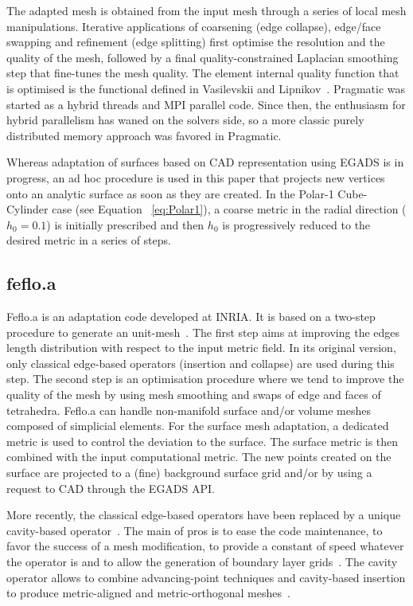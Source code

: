 \documentclass[3p,times,procedia,number]{elsarticle}
\begin{document}
The adapted mesh is obtained from the input mesh through a series of
local mesh manipulations. Iterative applications of coarsening (edge collapse),
edge/face swapping and refinement (edge splitting) first optimise the
resolution and the quality of the mesh, followed by a final
quality-constrained Laplacian smoothing step that fine-tunes the mesh
quality. The element internal quality function that is optimised is
the functional defined in Vasilevskii and Lipnikov~\cite{Vasilevskii-1999}.
Pragmatic was started as a hybrid threads and MPI parallel code. Since
then, the enthusiasm for hybrid parallelism has waned on the solvers side,
so a more classic purely distributed memory approach was favored in 
Pragmatic.

Whereas adaptation of surfaces based on CAD representation using EGADS
is in progress, an ad hoc procedure is used in this paper that projects 
new vertices onto an analytic surface as soon as they are created.
In the Polar-1 Cube-Cylinder case (see Equation ~\ref{eq:Polar1}),
a coarse metric in the radial direction
($h_0 = 0.1$) is initially prescribed and then
$h_0$ is progressively reduced to the desired metric in a series of steps.

\subsection{feflo.a}

Feflo.a is an adaptation code developed at INRIA.
It is based on a two-step procedure to generate an unit-mesh~\cite{loseille-lohner-adapt-boom,loseille-handbook}.
The first step aims at improving the edges length distribution
with respect to the input metric field.
In its original version, only classical edge-based operators (insertion and collapse) are used during this step.
The second step is an optimisation procedure where we tend to improve the quality of the mesh by using mesh smoothing
and swaps of edge and faces of tetrahedra.
Feflo.a can handle non-manifold surface and/or volume meshes composed of simplicial elements.
For the surface mesh
adaptation, a dedicated metric is used to control the deviation to the surface.
The surface metric is then combined with the input computational metric.
The new points created on the surface are projected to a (fine) background surface grid and/or by using a request to CAD through the EGADS API.

More recently, the classical edge-based operators have been replaced by a unique cavity-based operator~\cite{loseille-menier-imr22-cavity,loseille-menier-alauzet-para-adapt}.
The main of pros is to ease the code maintenance,
to favor the success of a mesh modification, to provide a constant of speed whatever the operator is and to allow the generation
of boundary layer grids~\cite{loseille-lohner-imr21-robust-bl-gen}.
The cavity operator allows to combine advancing-point techniques
and cavity-based insertion to produce metric-aligned and metric-orthogonal meshes~\cite{loseille-imr-metric-ortho-aniso-gen}.
\end{document}
